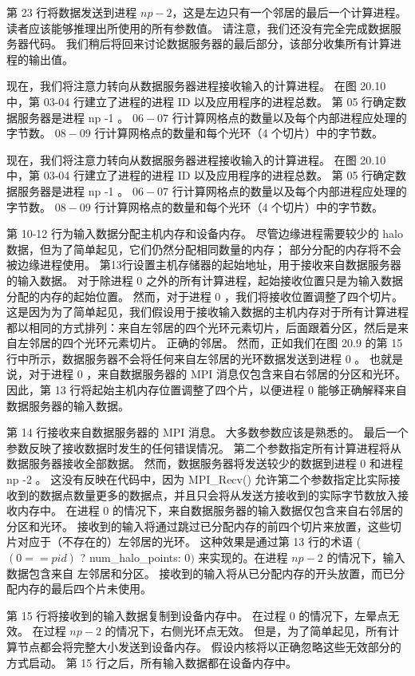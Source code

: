 第 23 行将数据发送到进程 $n p-2$，这是左边只有一个邻居的最后一个计算进程。 读者应该能够推理出所使用的所有参数值。 请注意，我们还没有完全完成数据服务器代码。 我们稍后将回来讨论数据服务器的最后部分，该部分收集所有计算进程的输出值。

现在，我们将注意力转向从数据服务器进程接收输入的计算进程。 在图 20.10 中，第 03-04 行建立了进程的进程 ID 以及应用程序的进程总数。 第 05 行确定数据服务器是进程 np -1 。 $06-07$ 行计算网格点的数量以及每个内部进程应处理的字节数。 $08-09$ 行计算网格点的数量和每个光环（4 个切片）中的字节数。

现在，我们将注意力转向从数据服务器进程接收输入的计算进程。 在图 20.10 中，第 03-04 行建立了进程的进程 ID 以及应用程序的进程总数。 第 05 行确定数据服务器是进程 np -1 。 $06-07$ 行计算网格点的数量以及每个内部进程应处理的字节数。 $08-09$ 行计算网格点的数量和每个光环（4 个切片）中的字节数。

第 10-12 行为输入数据分配主机内存和设备内存。 尽管边缘进程需要较少的 halo 数据，但为了简单起见，它们仍然分配相同数量的内存； 部分分配的内存将不会被边缘进程使用。 第13行设置主机存储器的起始地址，用于接收来自数据服务器的输入数据。 对于除进程 0 之外的所有计算进程，起始接收位置只是为输入数据分配的内存的起始位置。 然而，对于进程 0 ，我们将接收位置调整了四个切片。 这是因为为了简单起见，我们假设用于接收输入数据的主机内存对于所有计算进程都以相同的方式排列：来自左邻居的四个光环元素切片，后面跟着分区，然后是来自左邻居的四个光环元素切片。 正确的邻居。 然而，正如我们在图 20.9 的第 15 行中所示，数据服务器不会将任何来自左邻居的光环数据发送到进程 0 。 也就是说，对于进程 0 ，来自数据服务器的 MPI 消息仅包含来自右邻居的分区和光环。 因此，第 13 行将起始主机内存位置调整了四个片，以便进程 0 能够正确解释来自数据服务器的输入数据。

第 14 行接收来自数据服务器的 MPI 消息。 大多数参数应该是熟悉的。 最后一个参数反映了接收数据时发生的任何错误情况。 第二个参数指定所有计算进程将从数据服务器接收全部数据。 然而，数据服务器将发送较少的数据到进程 0 和进程 $\mathrm{np}$ -2 。 这没有反映在代码中，因为 MPI\_Recv() 允许第二个参数指定比实际接收到的数据点数量更多的数据点，并且只会将从发送方接收到的实际字节数放入接收内存中。 在进程 0 的情况下，来自数据服务器的输入数据仅包含来自右邻居的分区和光环。 接收到的输入将通过跳过已分配内存的前四个切片来放置，这些切片对应于（不存在的）左邻居的光环。 这种效果是通过第 13 行的术语 ( $(0==p i d)$ ? num\_halo\_points: 0$)$ 来实现的。在进程 $n p-2$ 的情况下，输入数据包含来自 左邻居和分区。 接收到的输入将从已分配内存的开头放置，而已分配内存的最后四个片未使用。

第 15 行将接收到的输入数据复制到设备内存中。 在过程 0 的情况下，左晕点无效。 在过程 $n p-2$ 的情况下，右侧光环点无效。 但是，为了简单起见，所有计算节点都会将完整大小发送到设备内存。 假设内核将以正确忽略这些无效部分的方式启动。 第 15 行之后，所有输入数据都在设备内存中。

